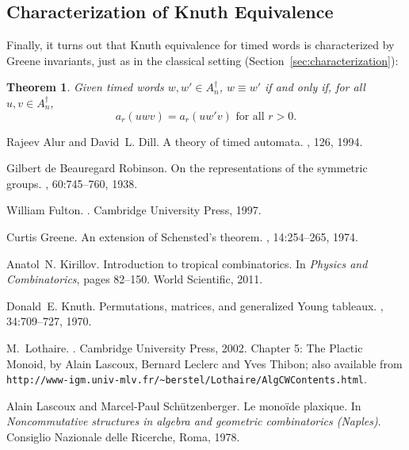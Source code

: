 \documentclass[10pt]{amsproc}
\newtheorem{theorem}{Theorem}[subsection]
\theoremstyle{definition}
\theoremstyle{remark}
\begin{document}
\subsection{Characterization of Knuth Equivalence}
\label{sec:char-knuth-equiv-timed}
Finally, it turns out that Knuth equivalence for timed words is characterized by Greene invariants, just as in the classical setting (Section~\ref{sec:characterization}):
\begin{theorem}
  Given timed words $w, w'\in A_n^\dagger$, $w\equiv w'$ if and only if, for all $u, v\in A_n^\dagger$,
  \begin{displaymath}
    a_r(uwv) = a_r(uw'v) \text{ for all } r>0.
  \end{displaymath}
\end{theorem}
\begin{thebibliography}{Pra18b}

Rajeev Alur and David~L. Dill.
\newblock A theory of timed automata.
, 126, 1994.

Gilbert de Beauregard Robinson.
\newblock On the representations of the symmetric groups.
, 60:745--760, 1938.

William Fulton.
.
\newblock Cambridge University Press, 1997.

Curtis Greene.
\newblock An extension of {S}chensted's theorem.
, 14:254--265, 1974.

Anatol~N. Kirillov.
\newblock Introduction to tropical combinatorics.
\newblock In {\em Physics and Combinatorics}, pages 82--150. World Scientific,
  2011.

Donald~E. Knuth.
\newblock Permutations, matrices, and generalized {Y}oung tableaux.
, 34:709--727, 1970.

M.~Lothaire.
.
\newblock Cambridge University Press, 2002.
\newblock Chapter 5: The Plactic Monoid, by Alain Lascoux, Bernard Leclerc and
  Yves Thibon; also available from
  \texttt{http://www-igm.univ-mlv.fr/\~{}berstel/Lothaire/AlgCWContents.html}.

Alain Lascoux and Marcel-Paul Sch\"{u}tzenberger.
\newblock Le mono\"{i}de plaxique.
\newblock In {\em Noncommutative structures in algebra and geometric
  combinatorics (Naples)}. Consiglio Nazionale delle Ricerche, Roma, 1978.


\end{thebibliography}
\end{document}
